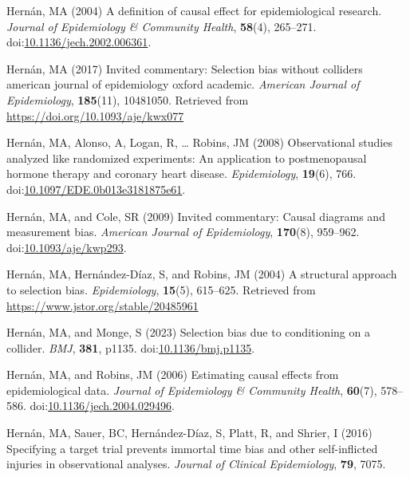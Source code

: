 \documentclass[
  singlecolumn,
  9pt]{article}
\begin{document}
\begin{CSLReferences}
Hernán, MA (2004) A definition of causal effect for epidemiological
research. \emph{Journal of Epidemiology \& Community Health},
\textbf{58}(4), 265--271.
doi:\href{https://doi.org/10.1136/jech.2002.006361}{10.1136/jech.2002.006361}.

Hernán, MA (2017) Invited commentary: Selection bias without colliders
\textbar{} american journal of epidemiology \textbar{} oxford academic.
\emph{American Journal of Epidemiology}, \textbf{185}(11), 10481050.
Retrieved from \url{https://doi.org/10.1093/aje/kwx077}

Hernán, MA, Alonso, A, Logan, R, \ldots{} Robins, JM (2008)
Observational studies analyzed like randomized experiments: An
application to postmenopausal hormone therapy and coronary heart
disease. \emph{Epidemiology}, \textbf{19}(6), 766.
doi:\href{https://doi.org/10.1097/EDE.0b013e3181875e61}{10.1097/EDE.0b013e3181875e61}.

Hernán, MA, and Cole, SR (2009) Invited commentary: Causal diagrams and
measurement bias. \emph{American Journal of Epidemiology},
\textbf{170}(8), 959--962.
doi:\href{https://doi.org/10.1093/aje/kwp293}{10.1093/aje/kwp293}.

Hernán, MA, Hernández-Díaz, S, and Robins, JM (2004) A structural
approach to selection bias. \emph{Epidemiology}, \textbf{15}(5),
615--625. Retrieved from \url{https://www.jstor.org/stable/20485961}

Hernán, MA, and Monge, S (2023) Selection bias due to conditioning on a
collider. \emph{BMJ}, \textbf{381}, p1135.
doi:\href{https://doi.org/10.1136/bmj.p1135}{10.1136/bmj.p1135}.

Hernán, MA, and Robins, JM (2006) Estimating causal effects from
epidemiological data. \emph{Journal of Epidemiology \& Community
Health}, \textbf{60}(7), 578--586.
doi:\href{https://doi.org/10.1136/jech.2004.029496}{10.1136/jech.2004.029496}.

Hernán, MA, Sauer, BC, Hernández-Díaz, S, Platt, R, and Shrier, I (2016)
Specifying a target trial prevents immortal time bias and other
self-inflicted injuries in observational analyses. \emph{Journal of
Clinical Epidemiology}, \textbf{79}, 7075.


\end{CSLReferences}
\end{document}
